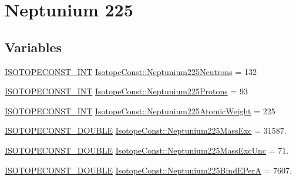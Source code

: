 \hypertarget{group___isotope_const-_neptunium-_np225}{}\section{Neptunium 225}
\label{group___isotope_const-_neptunium-_np225}
\subsection*{Variables}
\begin{DoxyCompactItemize}
\item 
\mbox{\hyperlink{group___isotope_const-_macros_ga5f18360b3e99483a35c32d789e62621c}{I\+S\+O\+T\+O\+P\+E\+C\+O\+N\+S\+T\+\_\+\+I\+NT}} \mbox{\hyperlink{group___isotope_const-_neptunium-_np225_gabe586057df38b807059f1917ebd0f450}{Isotope\+Const\+::\+Neptunium225\+Neutrons}} = 132
\item 
\mbox{\hyperlink{group___isotope_const-_macros_ga5f18360b3e99483a35c32d789e62621c}{I\+S\+O\+T\+O\+P\+E\+C\+O\+N\+S\+T\+\_\+\+I\+NT}} \mbox{\hyperlink{group___isotope_const-_neptunium-_np225_ga0c0a31fcbc6f7e162c21d238d6b7a9e1}{Isotope\+Const\+::\+Neptunium225\+Protons}} = 93
\item 
\mbox{\hyperlink{group___isotope_const-_macros_ga5f18360b3e99483a35c32d789e62621c}{I\+S\+O\+T\+O\+P\+E\+C\+O\+N\+S\+T\+\_\+\+I\+NT}} \mbox{\hyperlink{group___isotope_const-_neptunium-_np225_ga377d24939e42e1693a275f7dbd970fe7}{Isotope\+Const\+::\+Neptunium225\+Atomic\+Weight}} = 225
\item 
\mbox{\hyperlink{group___isotope_const-_macros_ga8f45a7272ce02c0b4c65c44636ed719a}{I\+S\+O\+T\+O\+P\+E\+C\+O\+N\+S\+T\+\_\+\+D\+O\+U\+B\+LE}} \mbox{\hyperlink{group___isotope_const-_neptunium-_np225_ga73081ae1e022d4c2bb05f990464917d9}{Isotope\+Const\+::\+Neptunium225\+Mass\+Exc}} = 31587.
\item 
\mbox{\hyperlink{group___isotope_const-_macros_ga8f45a7272ce02c0b4c65c44636ed719a}{I\+S\+O\+T\+O\+P\+E\+C\+O\+N\+S\+T\+\_\+\+D\+O\+U\+B\+LE}} \mbox{\hyperlink{group___isotope_const-_neptunium-_np225_ga5775405b709a4f9bd0f26e56f347a89b}{Isotope\+Const\+::\+Neptunium225\+Mass\+Exc\+Unc}} = 71.
\item 
\mbox{\hyperlink{group___isotope_const-_macros_ga8f45a7272ce02c0b4c65c44636ed719a}{I\+S\+O\+T\+O\+P\+E\+C\+O\+N\+S\+T\+\_\+\+D\+O\+U\+B\+LE}} \mbox{\hyperlink{group___isotope_const-_neptunium-_np225_gabb2d5d3767e4b3371af095872bf289d2}{Isotope\+Const\+::\+Neptunium225\+Bind\+E\+PerA}} = 7607.
\item 

\end{DoxyCompactItemize}
